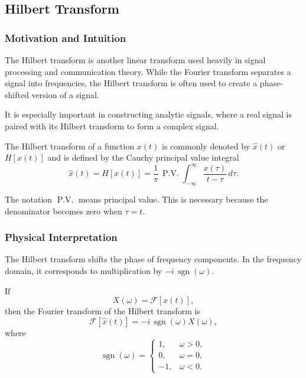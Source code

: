 \subsection{Hilbert Transform}

\subsubsection*{Motivation and Intuition}

The Hilbert transform is another linear transform used heavily in signal processing and communication theory. While the Fourier transform separates a signal into frequencies, the Hilbert transform is often used to create a phase-shifted version of a signal.

It is especially important in constructing analytic signals, where a real signal is paired with its Hilbert transform to form a complex signal.

\begin{conceptbox}
    The Hilbert transform of a function $x(t)$ is commonly denoted by $\hat{x}(t)$ or $H[x(t)]$ and is defined by the Cauchy principal value integral
    \[
        \hat{x}(t)
        =
        H[x(t)]
        =
        \frac{1}{\pi}\,\operatorname{P.V.}
        \int_{-\infty}^{\infty}
        \frac{x(\tau)}{t-\tau}\,d\tau.
    \]
\end{conceptbox}

The notation $\operatorname{P.V.}$ means principal value. This is necessary because the denominator becomes zero when $\tau=t$.

\subsubsection*{Physical Interpretation}

The Hilbert transform shifts the phase of frequency components. In the frequency domain, it corresponds to multiplication by $-i\,\operatorname{sgn}(\omega)$.

\begin{conceptbox}
    If
    \[
        X(\omega)=\mathcal{F}[x(t)],
    \]
    then the Fourier transform of the Hilbert transform is
    \[
        \mathcal{F}[\hat{x}(t)]
        =
        -i\,\operatorname{sgn}(\omega)X(\omega),
    \]
    where
    \[
        \operatorname{sgn}(\omega)
        =
        \begin{cases}
            1,  & \omega>0, \\
            0,  & \omega=0, \\
            -1, & \omega<0.
        \end{cases}
    \]
\end{conceptbox}

